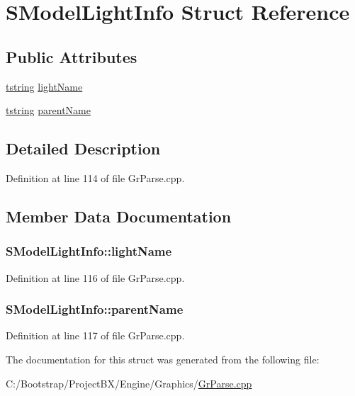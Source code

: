 \hypertarget{struct_s_model_light_info}{
\section{SModelLightInfo Struct Reference}
\label{struct_s_model_light_info}
}
\subsection*{Public Attributes}
\begin{CompactItemize}
\item 
\hyperlink{common__afx_8h_816fa58fd77499b0edb2c69ebe803d5c}{tstring} \hyperlink{struct_s_model_light_info_a5ffac52c8bd8fa444badb630f54656b}{lightName}
\item 
\hyperlink{common__afx_8h_816fa58fd77499b0edb2c69ebe803d5c}{tstring} \hyperlink{struct_s_model_light_info_6597fccf77dbc2c8268aab84d783c035}{parentName}
\end{CompactItemize}


\subsection{Detailed Description}


Definition at line 114 of file GrParse.cpp.

\subsection{Member Data Documentation}
\hypertarget{struct_s_model_light_info_a5ffac52c8bd8fa444badb630f54656b}{
\subsubsection[{lightName}]{ {\bf SModelLightInfo::lightName}}}
\label{struct_s_model_light_info_a5ffac52c8bd8fa444badb630f54656b}




Definition at line 116 of file GrParse.cpp.\hypertarget{struct_s_model_light_info_6597fccf77dbc2c8268aab84d783c035}{
\subsubsection[{parentName}]{ {\bf SModelLightInfo::parentName}}}
\label{struct_s_model_light_info_6597fccf77dbc2c8268aab84d783c035}




Definition at line 117 of file GrParse.cpp.

The documentation for this struct was generated from the following file:\begin{CompactItemize}
\item 
C:/Bootstrap/ProjectBX/Engine/Graphics/\hyperlink{_gr_parse_8cpp}{GrParse.cpp}\end{CompactItemize}
